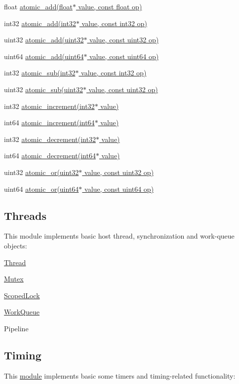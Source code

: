 \begin{DoxyItemize}
\item float \hyperlink{group___atomics_ga0c9d949be7ac5b6f27a232c7cd27a05c}{atomic\+\_\+add(float$\ast$ value, const float op)}
\item int32 \hyperlink{group___atomics_ga584797bd163a76c90bf0fb5c7df58de4}{atomic\+\_\+add(int32$\ast$ value, const int32 op)}
\item uint32 \hyperlink{group___atomics_ga130aea0c6d0c91af08bea4b52d6a8208}{atomic\+\_\+add(uint32$\ast$ value, const uint32 op)}
\item uint64 \hyperlink{group___atomics_gaed434d4f310d826a6e39932269de15c4}{atomic\+\_\+add(uint64$\ast$ value, const uint64 op)}
\item int32 \hyperlink{group___atomics_ga3efc1d5c63f30d1ee11887f76744bafe}{atomic\+\_\+sub(int32$\ast$ value, const int32 op)}
\item uint32 \hyperlink{group___atomics_ga9d9415fae4e05362c8d6f43d2fd61c60}{atomic\+\_\+sub(uint32$\ast$ value, const uint32 op)}
\item int32 \hyperlink{group___atomics_ga3034bbde9594dc3c4894fe31ad5a0b3c}{atomic\+\_\+increment(int32$\ast$ value)}
\item int64 \hyperlink{group___atomics_ga57595e5240e01e562a47816a82e14dd2}{atomic\+\_\+increment(int64$\ast$ value)}
\item int32 \hyperlink{group___atomics_ga60cd477d17c1ff78aa673ce06b60b569}{atomic\+\_\+decrement(int32$\ast$ value)}
\item int64 \hyperlink{group___atomics_gae94ecfb92e8d261326f527daa39c770d}{atomic\+\_\+decrement(int64$\ast$ value)}
\item uint32 \hyperlink{group___atomics_ga4b242819dd9c2a9986e0ea35b4883f67}{atomic\+\_\+or(uint32$\ast$ value, const uint32 op)}
\item uint64 \hyperlink{group___atomics_ga5d15edb3c64f3cde839eb76c54aacf7c}{atomic\+\_\+or(uint64$\ast$ value, const uint64 op)} 
\end{DoxyItemize}\hypertarget{threads_page}{}\subsection{Threads}\label{threads_page}
This module implements basic host thread, synchronization and work-\/queue objects\+:


\begin{DoxyItemize}
\item \hyperlink{classcugar_1_1_thread}{Thread}
\item \hyperlink{classcugar_1_1_mutex}{Mutex}
\item \hyperlink{classcugar_1_1_scoped_lock}{Scoped\+Lock}
\item \hyperlink{classcugar_1_1_work_queue}{Work\+Queue}
\item Pipeline 
\end{DoxyItemize}\hypertarget{timing_page}{}\subsection{Timing}\label{timing_page}
This \hyperlink{group___timers_module}{module} implements basic some timers and timing-\/related functionality\+:



